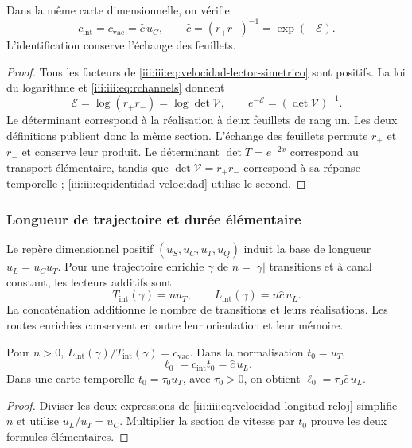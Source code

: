 \begin{proposition}
\label{iii:iii:prop:identidad-velocidad}
Dans la même carte dimensionnelle, on vérifie
\begin{equation}
 c_{\mathrm{int}}=c_{\mathrm{vac}}=\widehat c\,u_C,
 \qquad \widehat c=(r_+r_-)^{-1}=\exp(-\mathcal E).
 \label{iii:iii:eq:identidad-velocidad}
\end{equation}
L'identification conserve l'échange des feuillets.
\end{proposition}
\begin{proof}
Tous les facteurs de \eqref{iii:iii:eq:velocidad-lector-simetrico} sont
positifs. La loi du logarithme et \eqref{iii:iii:eq:rchannels} donnent
\[
 \mathcal E=\log(r_+r_-)=\log\det\mathcal V,
 \qquad e^{-\mathcal E}=(\det\mathcal V)^{-1}.
\]
Le déterminant correspond à la réalisation à deux feuillets de rang un.
Les deux définitions publient donc la même section. L’échange
des feuillets permute $r_+$ et $r_-$ et conserve leur produit. Le déterminant
$\det T=e^{-2x}$ correspond au transport élémentaire, tandis que
$\det\mathcal V=r_+r_-$ correspond à sa réponse temporelle ;
\eqref{iii:iii:eq:identidad-velocidad} utilise le second.
\end{proof}

\subsubsection{Longueur de trajectoire et durée élémentaire}

Le repère dimensionnel positif $(u_S,u_C,u_T,u_Q)$ induit la base de longueur $u_L=u_Cu_T$. Pour une trajectoire enrichie $\gamma$ de $n=|\gamma|$ transitions et à canal constant, les lecteurs additifs sont
\begin{equation}
 T_{\mathrm{int}}(\gamma)=nu_T,
 \qquad L_{\mathrm{int}}(\gamma)=n\widehat c\,u_L.
 \label{iii:iii:eq:velocidad-longitud-reloj}
\end{equation}
La concaténation additionne le nombre de transitions et leurs réalisations.
Les routes enrichies conservent en outre leur orientation et leur mémoire.

\begin{corollary}
Pour $n>0$, $L_{\mathrm{int}}(\gamma)/T_{\mathrm{int}}(\gamma)
=c_{\mathrm{vac}}$. Dans la normalisation $t_0=u_T$,
\begin{equation}
 \ell_0=c_{\mathrm{int}}t_0=\widehat c\,u_L.
 \label{iii:iii:eq:longitud-elemental-constitutiva}
\end{equation}
Dans une carte temporelle $t_0=\tau_0u_T$, avec $\tau_0>0$, on obtient
$\ell_0=\tau_0\widehat c\,u_L$.
\end{corollary}
\begin{proof}
Diviser les deux expressions de \eqref{iii:iii:eq:velocidad-longitud-reloj} simplifie $n$ et utilise $u_L/u_T=u_C$. Multiplier la section de vitesse par $t_0$ prouve les deux formules élémentaires.
\end{proof}

